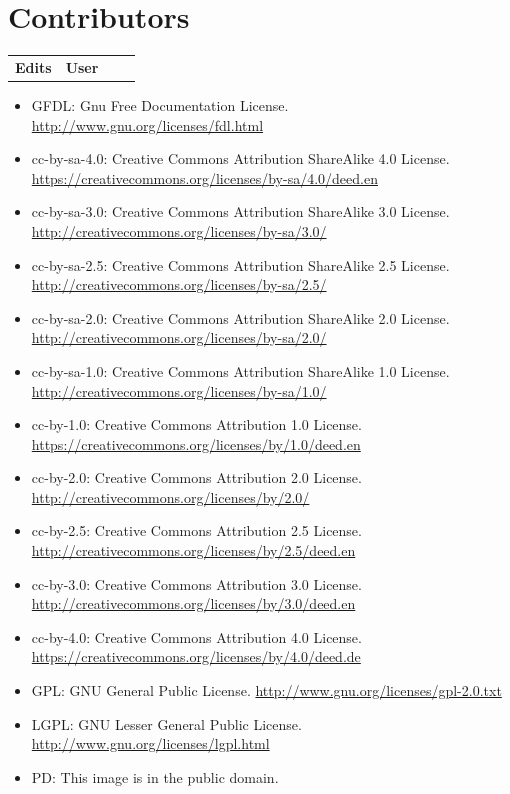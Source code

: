 \chapter{Contributors}
\label{Contributors}
\begin{longtable}{rp{0.6\linewidth}}
\textbf{Edits}&\textbf{User}\\
\end{longtable}
\pagebreak
\listoffigures
\label{ListOfFigures}
\begin{itemize}
\item GFDL: Gnu Free Documentation License. \url{http://www.gnu.org/licenses/fdl.html}
\item cc-by-sa-4.0:  Creative Commons Attribution ShareAlike 4.0 License. \url{https://creativecommons.org/licenses/by-sa/4.0/deed.en} 
\item cc-by-sa-3.0:  Creative Commons Attribution ShareAlike 3.0 License. \url{http://creativecommons.org/licenses/by-sa/3.0/} 
\item cc-by-sa-2.5:  Creative Commons Attribution ShareAlike 2.5 License. \url{http://creativecommons.org/licenses/by-sa/2.5/} 
\item cc-by-sa-2.0:  Creative Commons Attribution ShareAlike 2.0 License. \url{http://creativecommons.org/licenses/by-sa/2.0/} 
\item cc-by-sa-1.0:  Creative Commons Attribution ShareAlike 1.0 License. \url{http://creativecommons.org/licenses/by-sa/1.0/} 
\item cc-by-1.0:  Creative Commons Attribution 1.0 License. \url{https://creativecommons.org/licenses/by/1.0/deed.en} 
\item cc-by-2.0:  Creative Commons Attribution 2.0 License.  \url{http://creativecommons.org/licenses/by/2.0/}  
\item cc-by-2.5:  Creative Commons Attribution 2.5 License. \url{http://creativecommons.org/licenses/by/2.5/deed.en}  
\item cc-by-3.0:  Creative Commons Attribution 3.0 License. \url{http://creativecommons.org/licenses/by/3.0/deed.en}
\item cc-by-4.0:  Creative Commons Attribution 4.0 License. \url{https://creativecommons.org/licenses/by/4.0/deed.de} 
\item GPL:  GNU General Public License. \url{http://www.gnu.org/licenses/gpl-2.0.txt} 
\item LGPL:  GNU Lesser General Public License. \url{http://www.gnu.org/licenses/lgpl.html}
 \item PD: This image is in the public domain.

\end{itemize}
